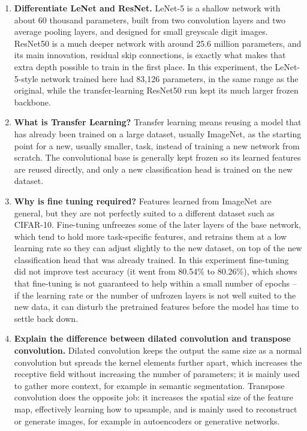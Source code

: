 \documentclass[11pt]{article}
\begin{document}
\begin{enumerate}
\item \textbf{Differentiate LeNet and ResNet.}
LeNet-5 is a shallow network with about 60 thousand parameters, built
from two convolution layers and two average pooling layers, and designed
for small greyscale digit images. ResNet50 is a much deeper network with
around 25.6 million parameters, and its main innovation, residual skip
connections, is exactly what makes that extra depth possible to train in
the first place. In this experiment, the LeNet-5-style network trained
here had 83,126 parameters, in the same range as the original, while the
transfer-learning ResNet50 run kept its much larger frozen backbone.

\item \textbf{What is Transfer Learning?}
Transfer learning means reusing a model that has already been trained on
a large dataset, usually ImageNet, as the starting point for a new,
usually smaller, task, instead of training a new network from scratch.
The convolutional base is generally kept frozen so its learned features
are reused directly, and only a new classification head is trained on the
new dataset.

\item \textbf{Why is fine tuning required?}
Features learned from ImageNet are general, but they are not perfectly
suited to a different dataset such as CIFAR-10. Fine-tuning unfreezes some
of the later layers of the base network, which tend to hold more
task-specific features, and retrains them at a low learning rate so they
can adjust slightly to the new dataset, on top of the new classification
head that was already trained. In this experiment fine-tuning did not
improve test accuracy (it went from 80.54\% to 80.26\%), which shows that
fine-tuning is not guaranteed to help within a small number of epochs --
if the learning rate or the number of unfrozen layers is not well suited
to the new data, it can disturb the pretrained features before the model
has time to settle back down.

\item \textbf{Explain the difference between dilated convolution and
transpose convolution.}
Dilated convolution keeps the output the same size as a normal
convolution but spreads the kernel elements further apart, which
increases the receptive field without increasing the number of
parameters; it is mainly used to gather more context, for example in
semantic segmentation. Transpose convolution does the opposite job: it
increases the spatial size of the feature map, effectively learning how
to upsample, and is mainly used to reconstruct or generate images, for
example in autoencoders or generative networks.


\end{enumerate}
\end{document}
